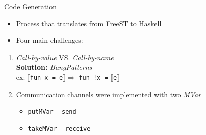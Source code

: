 \documentclass[unknownkeysallowed]{beamer}
\begin{document}
\begin{frame}[fragile]{Code Generation}
  \begin{itemize}
  \item Process that translates from FreeST to Haskell
  \item Four main challenges:
  \end{itemize}
  \begin{enumerate}
    \item \textit{Call-by-value} VS. \textit{Call-by-name}\\
      \textbf{Solution:} \textit{BangPatterns}\\      
      ex: $\llbracket$\lstinline|fun x = e|$\rrbracket \Rightarrow$ \lstinline|fun !x =| $\llbracket$\lstinline|e|$\rrbracket$ 
    \newline
    \item Communication channels were implemented with two \textit{MVar}      
   \begin{itemize}
   \item \lstinline[Haskell]|putMVar| -- \lstinline|send|
   \item \lstinline[Haskell]|takeMVar| -- \lstinline|receive|
   \end{itemize}
  \end{enumerate}
\end{frame}
\end{document}
